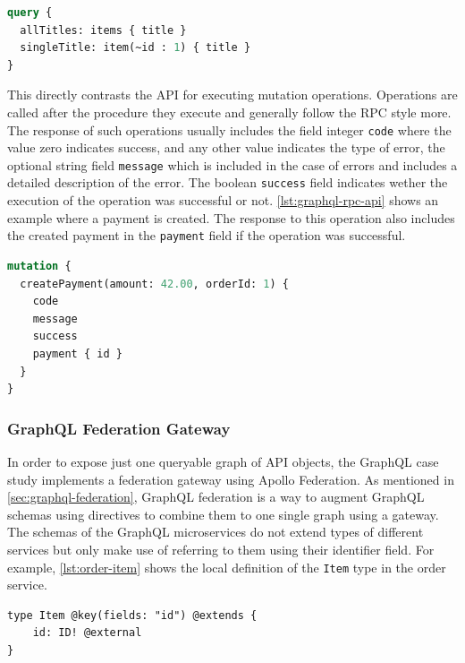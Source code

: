 \begin{lstlisting}[caption={Query to Obtain Resources of the GraphQL \acs{API}}, language=graphql, label={lst:graphql-res-api}]
query {
  allTitles: items { title }
  singleTitle: item(~id : 1) { title }
}
\end{lstlisting}

This directly contrasts the \ac{API} for executing mutation operations.
Operations are called after the procedure they execute and generally follow the \ac{RPC} style more.
The response of such operations usually includes the field integer \texttt{code} where the value zero indicates success, and any other value indicates the type of error, the optional string field \texttt{message} which is included in the case of errors and includes a detailed description of the error.
The boolean \texttt{success} field indicates wether the execution of the operation was successful or not.
\autoref{lst:graphql-rpc-api} shows an example where a payment is created.
The response to this operation also includes the created payment in the \texttt{payment} field if the operation was successful.

\begin{lstlisting}[caption={Mutation to Create a Payment in the GraphQL \acs{API}}, language=graphql, label={lst:graphql-rpc-api}]
mutation {
  createPayment(amount: 42.00, orderId: 1) {
    code
    message
    success
    payment { id }
  }
}
\end{lstlisting}

\subsubsection{GraphQL Federation Gateway}

In order to expose just one queryable graph of \ac{API} objects, the GraphQL case study implements a federation gateway using Apollo Federation.
As mentioned in \autoref{sec:graphql-federation}, GraphQL federation is a way to augment GraphQL schemas using directives to combine them to one single graph using a gateway.
The schemas of the GraphQL microservices do not extend types of different services but only make use of referring to them using their identifier field.
For example, \autoref{lst:order-item} shows the local definition of the \texttt{Item} type in the order service.

\begin{lstlisting}[caption={Schema Definition to Enable Federation}, language=graphqls, label={lst:order-item}]
type Item @key(fields: "id") @extends {
    id: ID! @external
}
\end{lstlisting}

